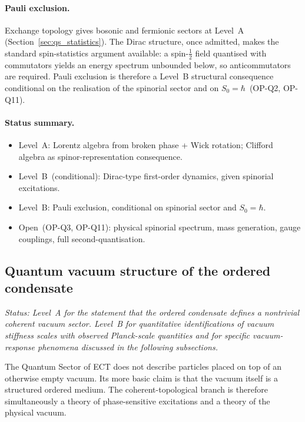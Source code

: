 \paragraph{Pauli exclusion.}
Exchange topology gives bosonic and fermionic sectors at Level~A
(Section~\ref{sec:qs_statistics}).
The Dirac structure, once admitted, makes the standard spin-statistics
argument available: a spin-$\tfrac{1}{2}$ field quantised with
commutators yields an energy spectrum unbounded below, so
anticommutators are required.
Pauli exclusion is therefore a Level~B structural consequence
conditional on the realisation of the spinorial sector and on
$S_0=\hbar$~(OP-Q2, OP-Q11).

\paragraph{Status summary.}
\begin{itemize}
  \item Level~A: Lorentz algebra from broken phase + Wick rotation;
    Clifford algebra as spinor-representation consequence.
  \item Level~B~(conditional): Dirac-type first-order dynamics,
    given spinorial excitations.
  \item Level~B: Pauli exclusion, conditional on spinorial sector
    and $S_0=\hbar$.
  \item Open~(OP-Q3, OP-Q11): physical spinorial spectrum,
    mass generation, gauge couplings, full second-quantisation.
\end{itemize}

\subsection{Quantum vacuum structure of the ordered condensate}
\label{sec:qs_vacuum_intro}

\textit{Status: Level~A for the statement that the ordered condensate
defines a nontrivial coherent vacuum sector.
Level~B for quantitative identifications of vacuum stiffness scales
with observed Planck-scale quantities and for specific vacuum-response
phenomena discussed in the following subsections.}

\medskip
The Quantum Sector of ECT does not describe particles placed on top of
an otherwise empty vacuum.
Its more basic claim is that the vacuum itself is a structured ordered
medium.
The coherent-topological branch is therefore simultaneously a theory of
phase-sensitive excitations and a theory of the physical vacuum.

